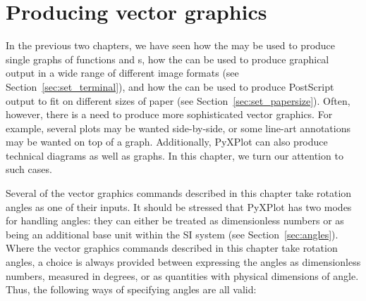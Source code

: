 %
%
%
%
%



\chapter{Producing vector graphics}
\label{ch:vector_graphics}

In the previous two chapters, we have seen how the  may be used
to produce single graphs of functions and \datafile s, how the  can be used to produce graphical output in a wide range of different
image formats (see Section~\ref{sec:set_terminal}), and how the  can be used to produce PostScript output to fit on different sizes
of paper (see Section~\ref{sec:set_papersize}). Often, however, there is a need
to produce more sophisticated vector graphics.  For example, several plots may
be wanted side-by-side, or some line-art annotations may be wanted on top of a
graph. Additionally, PyXPlot can also produce technical diagrams as well as
graphs. In this chapter, we turn our attention to such cases.

Several of the vector graphics commands described in this chapter take rotation
angles as one of their inputs.  It should be stressed that PyXPlot has two
modes for handling angles: they can either be treated as dimensionless numbers
or as being an additional base unit within the SI system (see
Section~\ref{sec:angles}).  Where the vector graphics commands described in
this chapter take rotation angles, a choice is always provided between
expressing the angles as dimensionless numbers, measured in degrees, or as
quantities with physical dimensions of angle. Thus, the following ways of
specifying angles are all valid:

